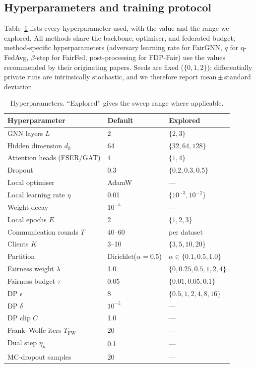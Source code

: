 \begin{appendices}

\section{Hyperparameters and training protocol}
\label{app:hyper}
Table~\ref{tab:hyper} lists every hyperparameter used, with the value and the
range we explored. All methods share the backbone, optimiser, and federated
budget; method-specific hyperparameters (adversary learning rate for FairGNN,
$q$ for q-FedAvg, $\beta$-step for FairFed, post-processing for FDP-Fair) use the
values recommended by their originating papers. Seeds are fixed
($\{0,1,2\}$); differentially private runs are intrinsically stochastic, and we
therefore report mean\,$\pm$\,standard deviation.

\begin{table}[h]
\centering\small
\caption{Hyperparameters. ``Explored'' gives the sweep range where applicable.}
\label{tab:hyper}
\begin{tabular}{lll}
\toprule
Hyperparameter & Default & Explored \\
\midrule
GNN layers $L$ & 2 & $\{2,3\}$ \\
Hidden dimension $d_h$ & 64 & $\{32,64,128\}$ \\
Attention heads (FSER/GAT) & 4 & $\{1,4\}$ \\
Dropout & 0.3 & $\{0.2,0.3,0.5\}$ \\
Local optimiser & AdamW & --- \\
Local learning rate $\eta$ & 0.01 & $\{10^{-3},10^{-2}\}$ \\
Weight decay & $10^{-5}$ & --- \\
Local epochs $E$ & 2 & $\{1,2,3\}$ \\
Communication rounds $T$ & 40--60 & per dataset \\
Clients $K$ & 3--10 & $\{3,5,10,20\}$ \\
Partition & Dirichlet($\alpha{=}0.5$) & $\alpha\in\{0.1,0.5,1.0\}$ \\
Fairness weight $\lambda$ & 1.0 & $\{0,0.25,0.5,1,2,4\}$ \\
Fairness budget $\tau$ & 0.05 & $\{0.01,0.05,0.1\}$ \\
DP $\epsilon$ & 8 & $\{0.5,1,2,4,8,16\}$ \\
DP $\delta$ & $10^{-5}$ & --- \\
DP clip $C$ & 1.0 & --- \\
Frank--Wolfe iters $T_{\mathrm{FW}}$ & 20 & --- \\
Dual step $\eta_\mu$ & 0.1 & --- \\
MC-dropout samples & 20 & --- \\
\bottomrule
\end{tabular}
\end{table}


\end{appendices}
